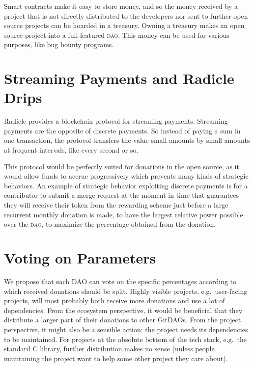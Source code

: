 Smart contracts make it easy to store money, and so the money received by a project that is not directly distributed to the developers nor sent to further open source projects can be hoarded in a treasury.
Owning a treasury makes an open source project into a full-featured \textsc{dao}.
This money can be used for various purposes, like bug bounty programs.

\section{Streaming Payments and Radicle Drips}

Radicle provides a blockchain protocol for streaming payments.
Streaming payments are the opposite of discrete payments.
So instead of paying a sum in one transaction, the protocol transfers the value small amounts by small amounts at frequent intervals, like every second or so.

This protocol would be perfectly suited for donations in the open source, as it would allow funds to accrue progressively which prevents many kinds of strategic behaviors.
An example of strategic behavior exploiting discrete payments is for a contributor to submit a merge request at the moment in time that guarantees they will receive their token from the rewarding scheme just before a large recurrent monthly donation is made, to have the largest relative power possible over the \textsc{dao}, to maximize the percentage obtained from the donation.

\section{Voting on Parameters}

We propose that each DAO can vote on the specific percentages according to which received donations should be split.
Highly visible projects, e.g.\ user-facing projects, will most probably both receive more donations and use a lot of dependencies.
From the ecosystem perspective, it would be beneficial that they distribute a larger part of their donations to other GitDAOs.
From the project perspective, it might also be a sensible action: the project needs its dependencies to be maintained.
For projects at the absolute bottom of the tech stack, e.g.\ the standard C library, further distribution makes no sense (unless people maintaining the project want to help some other project they care about).
%
